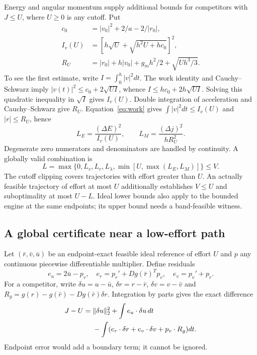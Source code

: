 Energy and angular momentum supply additional bounds for competitors
with $J\le U$, where $U\ge0$ is any cutoff. Put
\begin{equation}
 \begin{split}
 c_0&=|v_0|^2+2/a-2/|r_0|,\\
 I_v(U)&=[h\sqrt U+\sqrt{h^2U+hc_0}]^2,\\
 R_U&=|r_0|+h|v_0|+g_mh^2/2+\sqrt{Uh^3/3}.
 \end{split}
\end{equation}
To see the first estimate, write $I=\int_0^h|v|^2dt$.
The work identity and Cauchy--Schwarz imply
$|v(t)|^2\le c_0+2\sqrt{UI}$, whence $I\le hc_0+2h\sqrt{UI}$.
Solving this quadratic inequality in $\sqrt I$ gives $I_v(U)$.
Double integration of acceleration and Cauchy--Schwarz give $R_U$.
Equation~\eqref{eq:work} gives
$\int|v|^2dt\le I_v(U)$ and $|r|\le R_U$, hence
\begin{equation}
 L_E=\frac{(\Delta E)^2}{I_v(U)},\qquad
 L_M=\frac{(\Delta j)^2}{hR_U^2}.
\end{equation}
Degenerate zero numerators and denominators are handled by continuity.
A globally valid combination is
\begin{equation}
 L=\max\{0,L_v,L_r,L_\lambda,
                  \min[U,\max(L_E,L_M)]\}\le V.
 \label{eq:globalL}
\end{equation}
The cutoff clipping covers trajectories with effort greater than $U$.
An actually feasible trajectory of effort at most $U$ additionally
establishes $V\le U$ and suboptimality at most $U-L$.
Ideal lower bounds also apply to the bounded engine at the same
endpoints; its upper bound needs a band-feasible witness.

\subsection{A global certificate near a low-effort path}
Let $(\bar r,\bar v,\bar u)$ be an endpoint-exact feasible ideal
reference of effort $U$ and $p$ any continuous piecewise differentiable
multiplier. Define residuals
\begin{equation}
 e_u=2\bar u-p_v,\quad
 e_r=p_r'+Dg(\bar r)^Tp_v,\quad e_v=p_v'+p_r.
\end{equation}
For a competitor, write $\delta u=u-\bar u$,
$\delta r=r-\bar r$, $\delta v=v-\bar v$ and
$R_g=g(r)-g(\bar r)-Dg(\bar r)\delta r$.
Integration by parts gives the exact difference
\begin{equation}
 \begin{split}
 J-U={}&\lVert\delta u\rVert_2^2+\int e_u\cdot\delta u\,dt\\
 &-\int(e_r\cdot\delta r+e_v\cdot\delta v+p_v\cdot R_g)dt.
 \end{split}
 \label{eq:gapidentity}
\end{equation}
Endpoint error would add a boundary term; it cannot be ignored.

